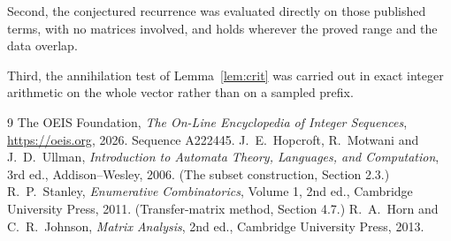 \documentclass[11pt,a4paper]{article}
\theoremstyle{plain}
\theoremstyle{definition}
\begin{document}
Second, the conjectured recurrence was evaluated directly on those published terms, with no
matrices involved, and holds wherever the proved range and the data overlap.

Third, the annihilation test of Lemma~\ref{lem:crit} was carried out in exact integer
arithmetic on the whole vector rather than on a sampled prefix.

\begin{thebibliography}{9}
 The OEIS Foundation, \emph{The On-Line Encyclopedia of Integer
Sequences}, \url{https://oeis.org}, 2026. Sequence A222445.
 J.~E.~Hopcroft, R.~Motwani and J.~D.~Ullman, \emph{Introduction to Automata
Theory, Languages, and Computation}, 3rd ed., Addison--Wesley, 2006. (The subset
construction, Section 2.3.)
 R.~P.~Stanley, \emph{Enumerative Combinatorics}, Volume 1, 2nd ed.,
Cambridge University Press, 2011. (Transfer-matrix method, Section 4.7.)
 R.~A.~Horn and C.~R.~Johnson, \emph{Matrix Analysis}, 2nd ed., Cambridge
University Press, 2013.
\end{thebibliography}
\end{document}
